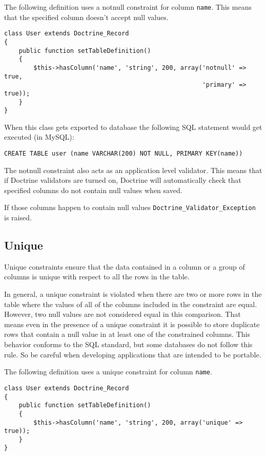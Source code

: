 \documentclass[11pt,a4paper]{report}
\begin{document}
The following definition uses a notnull constraint for column \texttt{name}. This means that the specified column doesn't accept null values.

\begin{verbatim}
class User extends Doctrine_Record
{
    public function setTableDefinition()
    {
        $this->hasColumn('name', 'string', 200, array('notnull' => true,
                                                      'primary' => true));
    }
}
\end{verbatim}

When this class gets exported to database the following SQL statement would get executed (in MySQL):

\begin{verbatim}
CREATE TABLE user (name VARCHAR(200) NOT NULL, PRIMARY KEY(name))
\end{verbatim}

The notnull constraint also acts as an application level validator. This means that if Doctrine validators are turned on, Doctrine will automatically check that specified columns do not contain null values when saved.

If those columns happen to contain null values \texttt{Doctrine\_Validator\_Exception} is raised.

\subsection{Unique}
Unique constraints ensure that the data contained in a column or a group of columns is unique with respect to all the rows in the table.

In general, a unique constraint is violated when there are two or more rows in the table where the values of all of the columns included in the constraint are equal. However, two null values are not considered equal in this comparison. That means even in the presence of a unique constraint it is possible to store duplicate rows that contain a null value in at least one of the constrained columns. This behavior conforms to the SQL standard, but some databases do not follow this rule. So be careful when developing applications that are intended to be portable.

The following definition uses a unique constraint for column \texttt{name}.

\begin{verbatim}
class User extends Doctrine_Record
{
    public function setTableDefinition()
    {
        $this->hasColumn('name', 'string', 200, array('unique' => true));
    }
}
\end{verbatim}
\end{document}
